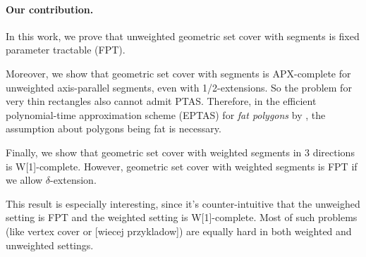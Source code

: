\paragraph{Our contribution.}
In this work, we prove that unweighted geometric set cover
with segments is fixed parameter tractable (FPT).

Moreover, we show that geometric set cover with segments
is APX-complete for unweighted axis-parallel segments,
even with 1/2-extensions.
So the problem for very thin rectangles
also cannot admit PTAS.
Therefore, in the efficient polynomial-time approximation scheme (EPTAS)
for \textit{fat polygons} by \cite{harpeled12},
the assumption about polygons being fat is necessary. 

Finally, we show that geometric set cover with weighted segments in
3 directions is W[1]-complete.
However, geometric set cover with weighted segments is FPT if we allow
$\delta$-extension.

This result is especially interesting,
since it's counter-intuitive that
the unweighed setting is FPT and the weighted
setting is W[1]-complete.
Most of such problems (like vertex cover or [wiecej przykladow])
are equally hard in both weighted and unweighted settings.

\fi
